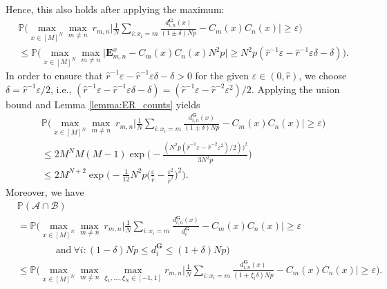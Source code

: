 \documentclass[a4paper,
               10pt,
               pdftex,
               normalheadings,
               headsepline,
               footsepline,
               headinclude,
               footinclude,
               DIV=14,
               abstracton]
{scrartcl}
\newcommand{\rv}[1]{\bm{#1}}
\begin{document}
    Hence, this also holds after applying the maximum:
    \begin{align}
        &\mathbb{P}\Big(\max_{x\in [M]^N} \max_{m\neq n}\ r_{m,n} \Big\lvert \frac{1}{N} \sum_{i : x_{i} = m} \frac{d^{\rv{G}}_{i,n}(x)}{(1\pm \delta)Np} - C_m(x) C_n(x) \Big\rvert \geq \varepsilon \Big)\\
        &\leq \mathbb{P}\Big(\max_{x\in [M]^N} \max_{m\neq n} \big\lvert \rv{E}^x_{m,n} - C_m(x) C_n(x) N^2 p \big\rvert \geq N^2 p (\hat{r}^{-1} \varepsilon - \hat{r}^{-1} \varepsilon \delta - \delta) \Big).
    \end{align}
    In order to ensure that $\hat{r}^{-1} \varepsilon - \hat{r}^{-1} \varepsilon \delta - \delta > 0$ for the given $\varepsilon \in (0,\hat{r})$, we choose $\delta = \hat{r}^{-1} \varepsilon / 2$, i.e., $(\hat{r}^{-1} \varepsilon - \hat{r}^{-1} \varepsilon \delta - \delta) = (\hat{r}^{-1} \varepsilon - \hat{r}^{-2} \varepsilon^2)/2$.
    Applying the union bound and Lemma \ref{lemma:ER_counts} yields
    \begin{align}
        &\mathbb{P}\Big(\max_{x\in [M]^{N}} \max_{m \neq n}\ r_{m,n} \Big\lvert \frac{1}{N} \sum_{i : x_{i} = m} \frac{d^{\rv{G}}_{i,n}(x)}{(1\pm \delta)Np} - C_m(x) C_n(x) \Big\rvert \geq \varepsilon \Big) \\
        &\leq 2 M^N M(M-1) \exp\Big(-\frac{(N^2 p (\hat{r}^{-1} \varepsilon - \hat{r}^{-2} \varepsilon^2)/2))^2}{3 N^2 p}  \Big)  \\
        &\leq 2 M^{N+2} \exp\Big(-\frac{1}{12} N^2 p \Big(\frac{\varepsilon}{\hat{r}} - \frac{\varepsilon^2}{\hat{r}^2}\Big)^2 \Big). \label{eq:ER_estim_bounds}
    \end{align}
    Moreover, we have
    \begin{align}
        &\mathbb{P}(\mathcal{A} \cap \mathcal{B})\\
        &= \mathbb{P}\Big( \max_{x\in [M]^{N}} \max_{m \neq n}\ r_{m,n} \Big\lvert \frac{1}{N} \sum_{i : x_{i} = m} \frac{d^{\rv{G}}_{i,n}(x)}{d^{\rv{G}}_i} - C_m(x) C_n(x) \Big\rvert \geq \varepsilon \\
        & \qquad \qquad \text{and}\ \forall i: (1-\delta)Np \leq d^{\rv{G}}_i \leq (1+\delta)Np \Big) \nonumber\\
        &\leq \mathbb{P}\Big(\max_{x\in [M]^{N}} \max_{m \neq n} \max_{\xi_1,\dots,\xi_N \in [-1,1]} r_{m,n} \Big\lvert \frac{1}{N} \sum_{i : x_{i} = m} \frac{d^{\rv{G}}_{i,n}(x)}{(1 + \xi_i \delta) N p} - C_m(x) C_n(x) \Big\rvert \geq \varepsilon \Big).
    \end{align}
\end{document}
